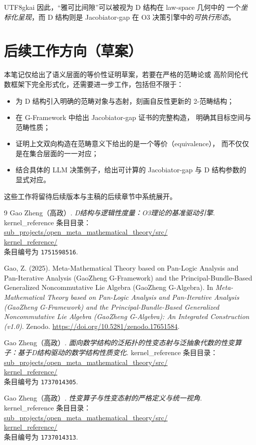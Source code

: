\documentclass[12pt]{article}
\begin{document}
\begin{CJK*}{UTF8}{gkai}
因此，“雅可比间隙”可以被视为 D 结构在 law-space 几何中的
一个\emph{坐标化呈现}，而 D 结构则是 Jacobiator-gap 在
O3 决策引擎中的\emph{可执行形态}。

\section{后续工作方向（草案）}

本笔记仅给出了语义层面的等价性证明草案，若要在严格的范畴论或
高阶同伦代数框架下完全形式化，还需要进一步工作，包括但不限于：
\begin{itemize}
  \item 为 D 结构引入明确的范畴对象与态射，刻画自反性更新的
        2-范畴结构；
  \item 在 G-Framework 中给出 Jacobiator-gap 证书的完整构造，
        明确其目标空间与范畴性质；
  \item 证明上文双向构造在范畴意义下给出的是一个等价（equivalence），
        而不仅仅是在集合层面的一一对应；
  \item 结合具体的 LLM 决策例子，给出可计算的 Jacobiator-gap
        与 D 结构参数的显式对应。
\end{itemize}

这些工作将留待后续版本与主稿的后续章节中系统展开。

\clearpage
\renewcommand{\refname}{\texorpdfstring{参考文献}{References}}
\begin{thebibliography}{9}
Gao Zheng（高政）.
\emph{D结构与逻辑性度量：O3理论的基准驱动引擎}.
kernel\_reference 条目目录：
\url{sub_projects/open_meta_mathematical_theory/src/}\\
\url{kernel_reference/}\\
条目编号为 \texttt{1751598516}.

Gao, Z. (2025).
\newblock Meta-Mathematical Theory based on Pan-Logic Analysis and
Pan-Iterative Analysis (GaoZheng G-Framework) and the
Principal-Bundle-Based Generalized Noncommutative Lie Algebra
(GaoZheng G-Algebra).
\newblock In \emph{Meta-Mathematical Theory based on Pan-Logic Analysis and
Pan-Iterative Analysis (GaoZheng G-Framework) and the
Principal-Bundle-Based Generalized Noncommutative Lie Algebra
(GaoZheng G-Algebra): An Integrated Construction (v1.0)}.
\newblock Zenodo.
\newblock \url{https://doi.org/10.5281/zenodo.17651584}.


Gao Zheng（高政）.
\emph{面向数学结构的泛拓扑的性变态射与泛抽象代数的性变算子：基于D结构驱动的数学结构性质变化}.
kernel\_reference 条目目录：
\url{sub_projects/open_meta_mathematical_theory/src/}\\
\url{kernel_reference/}\\
条目编号为 \texttt{1737014305}.

Gao Zheng（高政）.
\emph{性变算子与性变态射的严格定义与统一视角}.
kernel\_reference 条目目录：
\url{sub_projects/open_meta_mathematical_theory/src/}\\
\url{kernel_reference/}\\
条目编号为 \texttt{1737014313}.
\end{thebibliography}

\clearpage
\end{CJK*}
\end{document}
